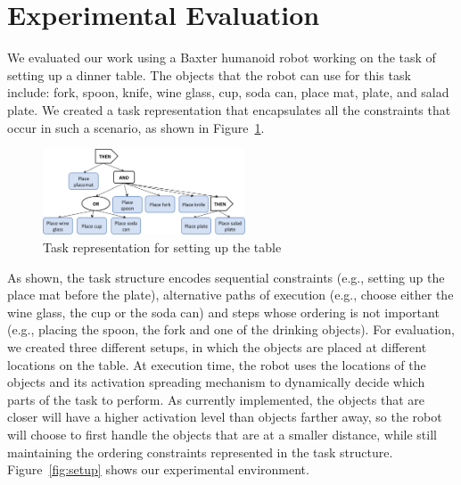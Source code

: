 \documentclass[letterpaper, 10 pt, conference]{ieeeconf}  %
\begin{document}
\addtolength{\textheight}{-15cm}   %
\section{Experimental Evaluation}
\label{evaluation}

We evaluated our work using a Baxter humanoid robot working on the task of setting up a dinner table. The objects that the robot can use for this task include: fork, spoon, knife, wine glass, cup, soda can, place mat, plate, and salad plate. We created a task representation that encapsulates all the constraints that occur in such a scenario, as shown in Figure~\ref{fig:set_table}. 

\begin{figure}
\centering
  \includegraphics[width=6cm]{set_table_task.png}
\caption{Task representation for setting up the table}
\label{fig:set_table}       %
\end{figure}

As shown, the task structure encodes sequential constraints (e.g., setting up the place mat before the plate), alternative paths of execution (e.g., choose either the wine glass, the cup or the soda can) and steps whose ordering is not important (e.g., placing the spoon, the fork and one of the drinking objects). For evaluation, we created three different setups, in which the objects are placed at different locations on the table. At execution time, the robot uses the locations of the objects and its activation spreading mechanism to dynamically decide which parts of the task to perform. As currently implemented, the objects that are closer will have a higher activation level than objects farther away, so the robot will choose to first handle the objects that are at a smaller distance, while still maintaining the ordering constraints represented in the task structure. Figure~\ref{fig:setup} shows our experimental environment.
\end{document}
